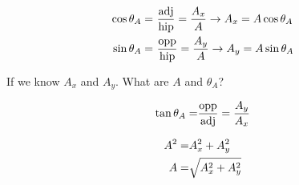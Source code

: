 	\begin{align}
		\cos \theta_{A} = \ &\frac{\text{adj}}{\text{hip}} = \frac{A_{x}}{A} \to A_{x} = A \cos \theta_{A}& \notag \\
		\sin \theta_{A} = \ &\frac{\text{opp}}{\text{hip}} = \frac{A_{y}}{A} \to A_{y} = A \sin \theta_{A}& \notag
	\end{align}

	If we know $A_{x}$ and $A_{y}$. What are $A$ and $\theta_{A}$?

	\begin{align}
		\tan \theta_{A} = &\frac{\text{opp}}{\text{adj}} = \frac{A_{y}}{A_{x}}& \notag
	\end{align}

	\begin{align}
		A^{2} = &A_{x}^{2} + A_{y}^{2}& \notag \\
		A = &\sqrt{A_{x}^{2} + A_{y}^{2}}& \notag
	\end{align}
